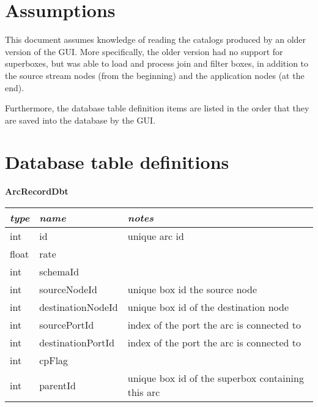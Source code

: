 \documentclass[a4paper,12pt]{article}
\begin{document}
\newcommand{\thisproj}{\bf GUI To Catalog Description}

\makeatletter                       %
\pagestyle{myheadings}              %
\def\@oddhead{\bf Aurora - \thisproj \hfill (rly)} 
\makeatother     

\section*{Assumptions}
This document assumes knowledge of reading the catalogs produced by an older version of the GUI.  More specifically, the older version had no support for superboxes, but was able to load and process join and filter boxes, in addition to the source stream nodes (from the beginning) and the application nodes (at the end).

Furthermore, the database table definition items are listed in the order that they are saved into the database by the GUI.

\section*{Database table definitions}

\hspace{.5in}
\textbf{ArcRecordDbt}
\vspace{.1in}

\begin{tabular}{|l|l|l|}
\hline
\em type & \em name    & \em notes \\\hline
int       & id            & unique arc id \\
float     & rate          &               \\
int       & schemaId      &               \\
int       & sourceNodeId  & unique box id the source node \\
int       & destinationNodeId & unique box id of the destination node \\
int       & sourcePortId  & index of the port the arc is connected to \\
int       & destinationPortId & index of the port the arc is connected to \\
int       & cpFlag        &                \\
int       & parentId      & unique box id of the superbox containing this arc \\\hline        
\end{tabular}
\end{document}
